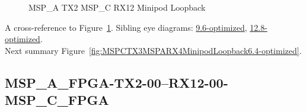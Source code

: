 \begin{figure}[h]
\begin{subfigure}{0.33\textwidth}
\hyperref[sec:MSPAFPGATX206RX1206MSPCFPGA6.4-optimized]{}
\end{subfigure}\hspace*{\fill}
\begin{subfigure}{0.33\textwidth}
\hyperref[sec:MSPAFPGATX207RX1207MSPCFPGA6.4-optimized]{}
\end{subfigure}\hspace*{\fill}
\begin{subfigure}{0.33\textwidth}
\hyperref[sec:MSPAFPGATX208RX1208MSPCFPGA6.4-optimized]{}
\end{subfigure}

\begin{subfigure}{0.33\textwidth}
\hyperref[sec:MSPAFPGATX209RX1209MSPCFPGA6.4-optimized]{}
\end{subfigure}\hspace*{\fill}
\begin{subfigure}{0.33\textwidth}
\hyperref[sec:MSPAFPGATX210RX1210MSPCFPGA6.4-optimized]{}
\end{subfigure}\hspace*{\fill}
\begin{subfigure}{0.33\textwidth}
\hyperref[sec:MSPAFPGATX211RX1211MSPCFPGA6.4-optimized]{}
\end{subfigure}

\caption{MSP\_A TX2 MSP\_C RX12 Minipod Loopback} \label{fig:MSPATX2MSPCRX12MinipodLoopback6.4-optimized}
\end{figure}

A cross-reference to Figure~\ref{fig:MSPATX2MSPCRX12MinipodLoopback6.4-optimized}.
Sibling eye diagrams: \hyperref[sec:MSPATX2MSPCRX12MinipodLoopback9.6-optimized]{9.6-optimized}, \hyperref[sec:MSPATX2MSPCRX12MinipodLoopback12.8-optimized]{12.8-optimized}. \\
Next summary Figure~\ref{fig:MSPCTX3MSPARX4MinipodLoopback6.4-optimized}.
\clearpage
% 
\subsection{MSP\_A\_FPGA-TX2-00--RX12-00-MSP\_C\_FPGA}\label{sec:MSPAFPGATX200RX1200MSPCFPGA6.4-optimized}

